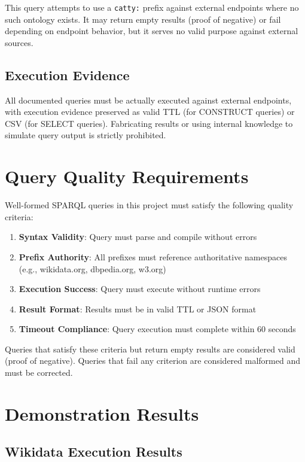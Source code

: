 This query attempts to use a \texttt{catty:} prefix against external endpoints where no such ontology exists. It may return empty results (proof of negative) or fail depending on endpoint behavior, but it serves no valid purpose against external sources.

\subsection{Execution Evidence}

All documented queries must be actually executed against external endpoints, with execution evidence preserved as valid TTL (for CONSTRUCT queries) or CSV (for SELECT queries). Fabricating results or using internal knowledge to simulate query output is strictly prohibited.

\section{Query Quality Requirements}

Well-formed SPARQL queries in this project must satisfy the following quality criteria:

\begin{enumerate}
  \item \textbf{Syntax Validity}: Query must parse and compile without errors
  \item \textbf{Prefix Authority}: All prefixes must reference authoritative namespaces (e.g., wikidata.org, dbpedia.org, w3.org)
  \item \textbf{Execution Success}: Query must execute without runtime errors
  \item \textbf{Result Format}: Results must be in valid TTL or JSON format
  \item \textbf{Timeout Compliance}: Query execution must complete within 60 seconds
\end{enumerate}

Queries that satisfy these criteria but return empty results are considered valid (proof of negative). Queries that fail any criterion are considered malformed and must be corrected.

\section{Demonstration Results}

\subsection{Wikidata Execution Results}

